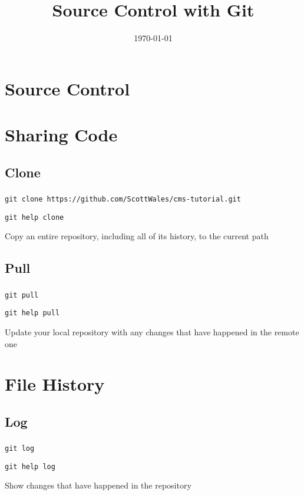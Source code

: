 \documentclass{beamer}
\title{Source Control with Git}
\date{\today}
\begin{document}
\begin{frame}
\titlepage
\end{frame}

\begin{frame}
\tableofcontents
\end{frame}

\section{Source Control}

\section{Sharing Code}
\subsection{Clone}
\begin{frame}
\frametitle{\insertsection}
\framesubtitle{\insertsubsection}

\texttt{git clone https://github.com/ScottWales/cms-tutorial.git}

\texttt{git help clone}

Copy an entire repository, including all of its history, to the current path
\end{frame}

\subsection{Pull}
\begin{frame}
\frametitle{\insertsection}
\framesubtitle{\insertsubsection}

\texttt{git pull}

\texttt{git help pull}

Update your local repository with any changes that have happened in the remote one
\end{frame}

\section{File History}
\subsection{Log}
\begin{frame}
\frametitle{\insertsection}
\framesubtitle{\insertsubsection}

\texttt{git log}

\texttt{git help log}

Show changes that have happened in the repository
\end{frame}
\end{document}
